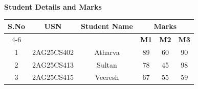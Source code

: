 \documentclass{article}
\begin{document}
    \begin{center}
        \Large\textbf{Student Details and Marks}
    \end{center}
    
    \vspace{0.2cm}
    
    \begin{table}[h]
        \centering
        \begin{tabular}{|c|c|c|c|c|c|}
        \hline
        \multirow{2}{*}{\textbf{S.No}} &
        \multirow{2}{*}{\textbf{USN}} &
        \multirow{2}{*}{\textbf{Student Name}} &
        \multicolumn{3}{c|}{\textbf{Marks}} \\
        \cline{4-6}
         & & & \textbf{M1} & \textbf{M2} & \textbf{M3} \\
        \hline
        
        1 & 2AG25CS402 & Atharva & 89 & 60 & 90 \\
        \hline
        2 & 2AG25CS413 & Sultan & 78 & 45 & 98 \\
        \hline
        3 & 2AG25CS415 & Veeresh & 67 & 55 & 59 \\
        \hline
        
        \end{tabular}
    \end{table}
\end{document}
